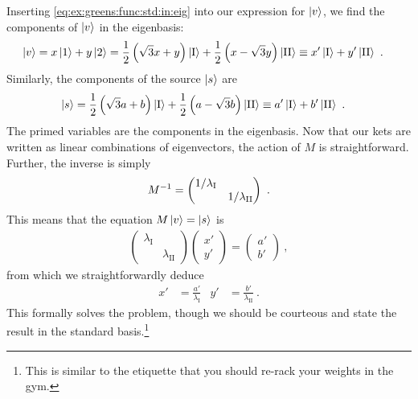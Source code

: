 \documentclass[12pt, oneside]{report}    %
\begin{document}
Inserting \eqref{eq:ex:greens:func:std:in:eig} into our expression for $\left|v\right\rangle$, we find the components of $\left|v\right\rangle$ in the eigenbasis:
\begin{align}
    \left|v\right\rangle &=
    x\left|1\right\rangle + y\left|2\right\rangle
    =
    \frac{1}{2}\left(\sqrt{3}x+y\right)\left|\textnormal{I}\right\rangle
    +
    \frac{1}{2}\left(x-\sqrt{3}y\right)\left|\textnormal{II}\right\rangle
    \equiv
    x' \left|\textnormal{I}\right\rangle + y' \left|\textnormal{II}\right\rangle \ .
\end{align}
Similarly, the components of the source $\left|s\right\rangle$ are
\begin{align}
    \left|s\right\rangle &=
    \frac{1}{2}\left(\sqrt{3}a+b\right)\left|\textnormal{I}\right\rangle
    +
    \frac{1}{2}\left(a-\sqrt{3}b\right)\left|\textnormal{II}\right\rangle
    \equiv
    a' \left|\textnormal{I}\right\rangle + b' \left|\textnormal{II}\right\rangle \ .
    \label{eq:eigen:greens:eg:source:components:eig}
\end{align}
The primed variables are the components in the eigenbasis. Now that our kets are written as linear combinations of eigenvectors, the action of $M$ is straightforward. Further, the inverse is simply
\begin{align}
    M^{-1} = 
    \begin{pmatrix}
        1/\lambda_\textnormal{I} &\\
        & 1/\lambda_\textnormal{II}
    \end{pmatrix} \ .
\end{align}
This means that the equation $M\left|v\right\rangle=\left|s\right\rangle$ is
\begin{align}
    \begin{pmatrix}
        \lambda_\text{I} & \\
        & \lambda_\text{II}
    \end{pmatrix}
    \begin{pmatrix}
        x' \\ y'
    \end{pmatrix}
    =
    \begin{pmatrix}
        a' \\
        b'
    \end{pmatrix} \ ,
\end{align}
from which we straightforwardly deduce
\begin{align}
    x' &= \frac{a'}{\lambda_\text{I}}
    &
    y' &= \frac{b'}{\lambda_\text{II}} \ .
\end{align}
This formally solves the problem, though we should be courteous and state the result in the standard basis.\footnote{This is similar to the etiquette that you should re-rack your weights in the gym.}
\end{document}
